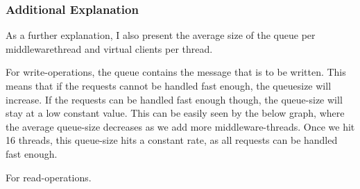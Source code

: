 \documentclass[11pt,a4paper]{article}
\begin{document}
\subsubsection{Additional Explanation}

As a further explanation, I also present the average size of the queue per middlewarethread and virtual clients per thread.

For write-operations, the queue contains the message that is to be written.
This means that if the requests cannot be handled fast enough, the queuesize will increase.
If the requests can be handled fast enough though, the queue-size will stay at a low constant value.
This can be easily seen by the below graph, where the average queue-size decreases as we add more middleware-threads.
Once we hit 16 threads, this queue-size hits a constant rate, as all requests can be handled fast enough.

For read-operations.
\end{document}

